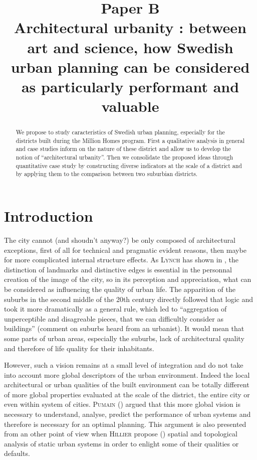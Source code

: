 \documentclass[english]{article}
\date{}
\newcommand{\noun}[1]{\textsc{#1}}
\begin{document}
\title{Paper B\\
Architectural urbanity : between art and science, how Swedish urban
planning can be considered as particularly performant and valuable}

\maketitle
\vspace{3cm}

\begin{abstract}
We propose to study caracteristics of Swedish urban planning, especially
for the districts built during the Million Homes program. First a
qualitative analysis in general and case studies inform on the
nature of these district and allow us to develop the notion of ``architectural
urbanity''. Then we consolidate the proposed ideas through
quantitative case study by constructing diverse indicators
at the scale of a district and by applying them to the comparison
between two suburbian districts.

\newpage{}
\end{abstract}

\section*{Introduction}

The city cannot (and shoudn't anyway?) be only composed of architectural
exceptions, first of all for technical and pragmatic evident reasons,
then maybe for more complicated internal structure effects. As \noun{Lynch}
has shown in \cite{Lyn60}, the distinction of landmarks and distinctive
edges is essential in the personnal creation of the image of the city,
so in its perception and appreciation, what can be considered as 
influencing the quality of urban life. The apparition of the suburbs
in the second middle of the 20th century directly followed that
logic and took it more dramatically as a general rule, which led
to ``aggregation of unperceptible and disagreable pieces, that we
can difficultly consider as buildings'' (comment on suburbs heard
from an urbanist). It would mean that some parts of urban areas,
especially the suburbs, lack of architectural quality and therefore
of life quality for their inhabitants.

\bigskip{}


However, such a vision remains at a small level of integration and do
not take into account more global descriptors of the urban environment. Indeed
the local architectural or urban qualities of the built environment
can be totally different of more global properties evaluated at the
scale of the district, the entire city or even within system of cities.
\noun{Pumain} (\cite{pumain1997pour}) argued that this more
global vision is necessary to understand, analyse, predict the performance
of urban systems and therefore is necessary for an optimal planning.
This argument is also presented from an other point of view when \noun{Hillier}
propose (\cite{hillier1976space}) spatial and topological analysis
of static urban systems in order to enlight some of their qualities
or defaults.
\end{document}
